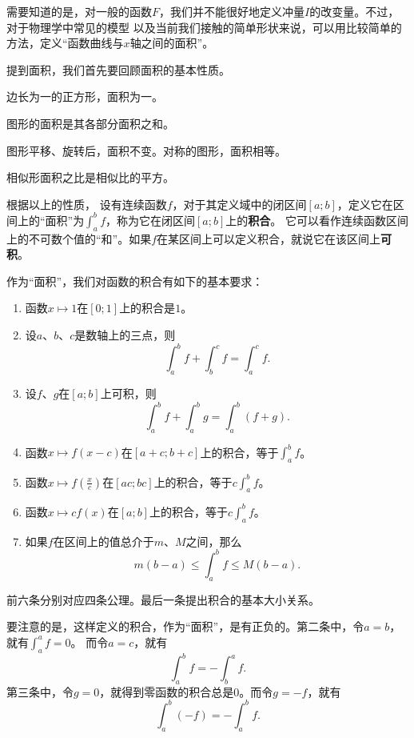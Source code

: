 \documentclass[12pt,UTF8]{ctexbook}
\begin{document}
需要知道的是，对一般的函数$F$，我们并不能很好地定义冲量$I$的改变量。不过，对于物理学中常见的模型
以及当前我们接触的简单形状来说，可以用比较简单的方法，定义“函数曲线与$x$轴之间的面积”。

提到面积，我们首先要回顾面积的基本性质。

\begin{po}
    边长为一的正方形，面积为一。
\end{po}

\begin{po}
    图形的面积是其各部分面积之和。
\end{po}

\begin{po}
    图形平移、旋转后，面积不变。对称的图形，面积相等。
\end{po}

\begin{po}
    相似形面积之比是相似比的平方。
\end{po}

根据以上的性质，
设有连续函数$f$，对于其定义域中的闭区间$[a; b]$，定义它在区间上的“面积”为$\int_a^b f$，称为它在闭区间$[a; b]$上的\textbf{积合}。
它可以看作连续函数区间上的不可数个值的“和”。如果$f$在某区间上可以定义积合，就说它在该区间上\textbf{可积}。

作为“面积”，我们对函数的积合有如下的基本要求：

\begin{enumerate}
    \item 函数$x\mapsto 1$在$[0;1]$上的积合是$1$。
    \item 设$a$、$b$、$c$是数轴上的三点，则
        $$\int_a^b f + \int_b^c f = \int_a^c f.$$
    \item 设$f$、$g$在$[a; b]$上可积，则
        $$ \int_a^b f + \int_a^b g = \int_a^b (f + g). $$
    \item 函数$x\mapsto f(x-c)$在$[a+c;b+c]$上的积合，等于$\int_a^b f$。
    \item 函数$x\mapsto f\left(\frac{x}{c}\right)$在$[ac; bc]$上的积合，等于$c\int_a^b f$。
    \item 函数$x\mapsto cf(x)$在$[a; b]$上的积合，等于$c\int_a^b f$。
    \item 如果$f$在区间上的值总介于$m$、$M$之间，那么
        $$m(b - a) \leqslant \int_a^b f \leqslant M(b - a).$$
\end{enumerate}
前六条分别对应四条公理。最后一条提出积合的基本大小关系。

要注意的是，这样定义的积合，作为“面积”，是有正负的。第二条中，令$a=b$，就有$\int_a^a f = 0$。
而令$a = c$，就有
$$\int_a^b f = - \int_b^a f.$$
第三条中，令$g=0$，就得到零函数的积合总是$0$。而令$g = -f$，就有
$$\int_a^b (-f) = -\int_a^b f. $$
\end{document}
